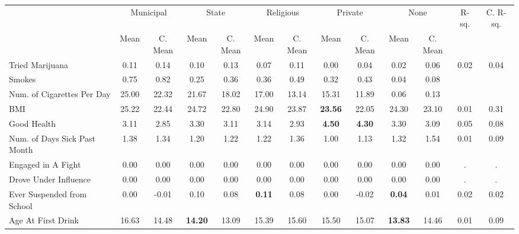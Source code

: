 \begin{tabular}{l c c c c c c c c c c c c}
\toprule
& \multicolumn{2}{c}{Municipal} & \multicolumn{2}{c}{State} & \multicolumn{2}{c}{Religious} & \multicolumn{2}{c}{Private} & \multicolumn{2}{c}{None} & R-sq. & C. R-sq. \\
& \scriptsize Mean & \scriptsize C. Mean & \scriptsize Mean & \scriptsize C. Mean & \scriptsize Mean & \scriptsize C. Mean & \scriptsize Mean & \scriptsize C. Mean & \scriptsize Mean & \scriptsize C. Mean & & \\
\midrule
Tried Marijuana &      0.11 & 0.14 &      0.10 & 0.13 &      0.07 & 0.11 &      0.00 & 0.04 &      0.02 & 0.06 &      0.02 &      0.04 \\
Smokes &      0.75 & 0.82 &      0.25 & 0.36 &      0.36 & 0.49 &      0.32 & 0.43 &      0.04 &      0.08 \\
Num. of Cigarettes Per Day &     25.00 & 22.32 &     21.67 & 18.02 &     17.00 & 13.14 &     15.31 & 11.89 &      0.06 &      0.13 \\
BMI &     25.22 & 22.44 &     24.72 & 22.80 &     24.90 & 23.87 & \textbf{    23.56} & 22.05 &     24.30 & 23.10 &      0.01 &      0.31 \\
Good Health &      3.11 & 2.85 &      3.30 & 3.11 &      3.14 & 2.93 & \textbf{     4.50} & \textbf{     4.30} &      3.30 & 3.09 &      0.05 &      0.08 \\
Num. of Days Sick Past Month &      1.38 & 1.34 &      1.20 & 1.22 &      1.22 & 1.36 &      1.00 & 1.13 &      1.32 & 1.54 &      0.01 &      0.09 \\
Engaged in A Fight &      0.00 & 0.00 &      0.00 & 0.00 &      0.00 & 0.00 &      0.00 & 0.00 &      0.00 & 0.00 &         . &         . \\
Drove Under Influence &      0.00 & 0.00 &      0.00 & 0.00 &      0.00 & 0.00 &      0.00 & 0.00 &      0.00 & 0.00 &         . &         . \\
Ever Suspended from School &      0.00 & -0.01 &      0.10 & 0.08 & \textbf{     0.11} & 0.08 &      0.00 & -0.02 & \textbf{     0.04} & 0.01 &      0.02 &      0.02 \\
Age At First Drink &     16.63 & 14.48 & \textbf{    14.20} & 13.09 &     15.39 & 15.60 &     15.50 & 15.07 & \textbf{    13.83} & 14.46 &      0.01 &      0.09 \\
\bottomrule
\end{tabular}
